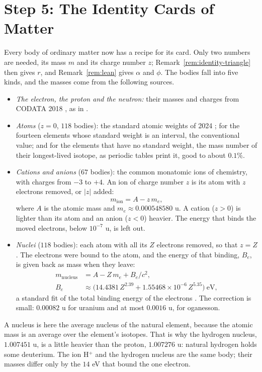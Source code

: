 \section{Step 5: The Identity Cards of Matter}\label{sec:sm-cards}

Every body of ordinary matter now has a recipe for its card. Only two numbers are needed, its mass $m$ and its charge number $z$; Remark~\ref{rem:identity-triangle} then gives $r$, and Remark~\ref{rem:lean} gives $\alpha$ and $\phi$. The bodies fall into five kinds, and the masses come from the following sources.
\begin{itemize}
  \item \emph{The electron, the proton and the neutron:} their masses and charges from CODATA 2018 \citep{CODATA2018}, as in .
  \item \emph{Atoms} ($z = 0$, $118$ bodies): the standard atomic weights of 2024 \citep{Prohaska2022,CIAAW2024}; for the fourteen elements whose standard weight is an interval, the conventional value; and for the elements that have no standard weight, the mass number of their longest-lived isotope, as periodic tables print it, good to about $0.1\%$.
  \item \emph{Cations and anions} ($67$ bodies): the common monatomic ions of chemistry, with charges from $-3$ to $+4$. An ion of charge number $z$ is its atom with $z$ electrons removed, or $|z|$ added:
  \[
  m_{\text{ion}} = A - z\,m_e ,
  \]
  where $A$ is the atomic mass and $m_e \approx 0.000548580$ u. A cation ($z > 0$) is lighter than its atom and an anion ($z < 0$) heavier. The energy that binds the moved electrons, below $10^{-7}$ u, is left out.
  \item \emph{Nuclei} ($118$ bodies): each atom with all its $Z$ electrons removed, so that $z = Z$. The electrons were bound to the atom, and the energy of that binding, $B_e$, is given back as mass when they leave:
  \begin{align*}
  m_{\text{nucleus}} &= A - Z\,m_e + B_e/c^2, \\
  B_e &\approx \bigl(14.4381\,Z^{2.39} + 1.55468 \times 10^{-6}\,Z^{5.35}\bigr)\ \mathrm{eV},
  \end{align*}
  a standard fit of the total binding energy of the electrons \citep{Lunney2003}. The correction is small: $0.00082$ u for uranium and at most $0.0016$ u, for oganesson.
\end{itemize}
A nucleus is here the average nucleus of the natural element, because the atomic mass is an average over the element's isotopes. That is why the hydrogen nucleus, $1.007451$ u, is a little heavier than the proton, $1.007276$ u: natural hydrogen holds some deuterium. The ion H$^+$ and the hydrogen nucleus are the same body; their masses differ only by the $14$ eV that bound the one electron.

